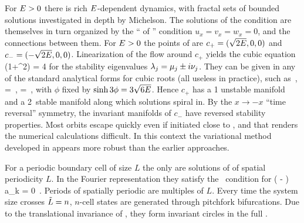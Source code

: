 For $E>0$ there is rich
$E$-dependent dynamics, with
fractal sets of bounded solutions investigated in
depth by Michelson.
The solutions of the {\eqv}  condition
 are themselves in turn organized by the
``{\eqva}  of {\eqva}''  condition
\( u_x= v_x= w_x= 0 \), and
the connections between them.
    For $E>0$ the {\eqv}  points of  are
$c_{+}=(\sqrt{2E},0,0)$ and $c_{-}=(-\sqrt{2E},0,0)$.
Linearization of the flow around
$c_{+}$ yields the cubic equation
  \beq
\eigExp(1+\eigExp^2) = 4 \expctE
for the
stability eigenvalues
$\eigExp[j] = \eigRe[j] \pm i \eigIm[j]$.
They can
be given in any of the standard analytical forms for cubic
roots  (all useless in practice), such as
    \,,\qquad
\eigRe=\sinh \phi
\,,\qquad
\eigIm=\cosh \phi \, ,
with $\phi$ fixed by $\sinh 3\phi=3\sqrt{6\expctE}$.
Hence $c_{+}$ has a {1\dmn}
unstable manifold and a 2\dmn\ stable manifold
along which solutions spiral in.
By the $x \to -x$ ``time reversal'' symmetry, the
invariant manifolds of $c_{-}$
have reversed stability properties.
Most orbits escape quickly even if initiated close to \eqva, and that
renders the numerical calculations
difficult.
In this context the variational method
developed in 
appears more robust than
the earlier approaches.


%
For a periodic boundary cell of size
$L$ the only {\eqva}  are
solutions of  of spatial periodicity $L$.
In the Fourier representation they satisfy
the \eqv\ condition for 
\beq
\left(  -   \right)\, a_k
  = 0
\,.
\label{eq:stfks}
\eeq
Periods of spatially periodic {\eqva} are multiples of $L$.
Every time the system size crosses  $\tilde{L}=n$,
$n$-cell states
are generated through pitchfork bifurcations.
Due to the translational invariance of {\KSe},
they form invariant circles
in the full \statesp.

